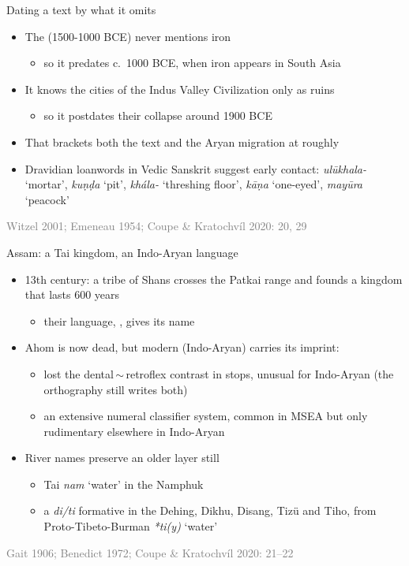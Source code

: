 \documentclass{beamer}
\newcommand{\asrc}[1]{{\par\raggedleft\tiny\textcolor{gray}{#1}\par}}
\begin{document}
\begin{frame}{Dating a text by what it omits}
  \begin{itemize}
  \item The \href{https://en.wikipedia.org/wiki/Rigveda}{}
    (1500-1000 BCE) never mentions iron
    \begin{itemize}
    \item so it predates c.\ 1000 BCE, when iron appears in South Asia
    \end{itemize}
  \item It knows the cities of the Indus Valley Civilization only as ruins
    \begin{itemize}
    \item so it postdates their collapse around 1900 BCE
    \end{itemize}
  \item That brackets both the text and the Aryan migration at
    roughly 
  \item Dravidian loanwords in Vedic Sanskrit suggest early contact:
    \emph{ulūkhala-} `mortar', \emph{kuṇḍa} `pit', \emph{khála-} `threshing
    floor', \emph{kāṇa} `one-eyed', \emph{mayūra} `peacock'
  \end{itemize}
  \asrc{Witzel 2001; Emeneau 1954; Coupe \& Kratochvíl 2020: 20, 29}
\end{frame}

\begin{frame}{Assam: a Tai kingdom, an Indo-Aryan language}
  \begin{itemize}
  \item 13th century: a tribe of Shans crosses the Patkai range and founds
    a kingdom that lasts 600 years
    \begin{itemize}
    \item their language, , gives  its name
    \end{itemize}
  \item Ahom is now dead, but modern  (Indo-Aryan) carries
    its imprint:
    \begin{itemize}
    \item lost the dental\,$\sim$\,retroflex contrast in stops, unusual for
      Indo-Aryan (the orthography still writes both)
    \item an extensive numeral classifier system, common in MSEA
      but only rudimentary elsewhere in Indo-Aryan
    \end{itemize}
  \item River names preserve an older layer still
    \begin{itemize}
    \item Tai \emph{nam} `water' in the Namphuk
    \item a \emph{di/ti} formative in the Dehing, Dikhu, Disang, Tizü and
      Tiho, from Proto-Tibeto-Burman \emph{*ti(y)} `water'
    \end{itemize}
  \end{itemize}
  \asrc{Gait 1906; Benedict 1972; Coupe \& Kratochvíl 2020: 21--22}
\end{frame}
\end{document}
